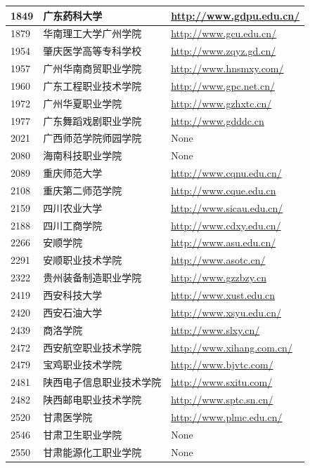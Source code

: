 \documentclass[logo,reportComp]{thesis}
\begin{document}
\begin{longtable}{|l|l|l|}
1849 & 广东药科大学 & \url{http://www.gdpu.edu.cn/}\\\hline
1879 & 华南理工大学广州学院 & \url{http://www.gcu.edu.cn/}\\\hline
1954 & 肇庆医学高等专科学校 & \url{http://www.zqyz.gd.cn/}\\\hline
1957 & 广州华南商贸职业学院 & \url{http://www.hnsmxy.com/}\\\hline
1960 & 广东工程职业技术学院 & \url{http://www.gpc.net.cn/}\\\hline
1972 & 广州华夏职业学院 & \url{http://www.gzhxtc.cn/}\\\hline
1977 & 广东舞蹈戏剧职业学院 & \url{http://www.gdddc.cn}\\\hline
2021 & 广西师范学院师园学院 & None\\\hline
2080 & 海南科技职业学院 & None\\\hline
2089 & 重庆师范大学 & \url{http://www.cqnu.edu.cn/}\\\hline
2108 & 重庆第二师范学院 & \url{http://www.cque.edu.cn}\\\hline
2159 & 四川农业大学 & \url{http://www.sicau.edu.cn/}\\\hline
2188 & 四川工商学院 & \url{http://www.cdxy.edu.cn/}\\\hline
2266 & 安顺学院 & \url{http://www.asu.edu.cn/}\\\hline
2291 & 安顺职业技术学院 & \url{http://www.asotc.cn/}\\\hline
2322 & 贵州装备制造职业学院 & \url{http://www.gzzbzy.cn}\\\hline
2419 & 西安科技大学 & \url{http://www.xust.edu.cn}\\\hline
2420 & 西安石油大学 & \url{http://www.xsyu.edu.cn/}\\\hline
2439 & 商洛学院 & \url{http://www.slxy.cn/}\\\hline
2472 & 西安航空职业技术学院 & \url{http://www.xihang.com.cn/}\\\hline
2479 & 宝鸡职业技术学院 & \url{http://www.bjvtc.com/}\\\hline
2481 & 陕西电子信息职业技术学院 & \url{http://www.sxitu.com/}\\\hline
2482 & 陕西邮电职业技术学院 & \url{http://www.sptc.sn.cn/}\\\hline
2520 & 甘肃医学院 & \url{http://www.plmc.edu.cn/}\\\hline
2546 & 甘肃卫生职业学院 & None\\\hline
2550 & 甘肃能源化工职业学院 & None\\\hline
\end{longtable}
\end{document}
